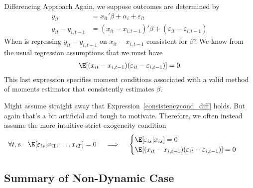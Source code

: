 \documentclass[aspectratio=169, handout]{beamer}
\begin{document}
{\footnotesize
\begin{frame}{Differencing Approach}
Again, we suppose outcomes are determined by
\begin{align}
  y_{it}
  &=
  x_{it}'\beta
  + \alpha_i
  + \varepsilon_{it}
  \\
  y_{it}-y_{i,t-1}
  &=
  (x_{it}-x_{i,t-1})'\beta
  + (\varepsilon_{it}-\varepsilon_{i,t-1})
\end{align}
When is regressing
$y_{it}-y_{i,t-1}$
on
$x_{it}-x_{i,t-1}$
consistent for
$\beta$?
\pause
We know from the usual regression assumptions that we must have
\begin{align}
  \E[(x_{it}-{x}_{i,t-1})(\varepsilon_{it}-{\varepsilon}_{i,t-1})]=0
  \label{consistencycond_diff}
\end{align}
This last expression specifies moment conditions associated with a
valid method of moments estimator that consistently estimates
$\beta$.

\pause
Might assume straight away that Expression~\ref{consistencycond_diff}
holds.
But again that's a bit artificial and tough to motivate.
Therefore, we often instead assume the more intuitive
\alert{strict exogeneity} condition
\begin{align}
  \forall t,s
  \quad
  \E[\varepsilon_{is}|x_{i1},\ldots,x_{iT}]
  &= 0
  \quad\implies\quad
  \begin{cases}
    \E[\varepsilon_{is}|x_{is}]=0
    \\
    \E[(x_{it}-{x}_{i,t-1})(\varepsilon_{it}-{\varepsilon}_{i,t-1})]=0
  \end{cases}
\end{align}
\end{frame}
}


\subsection{Summary of Non-Dynamic Case}
\end{document}
